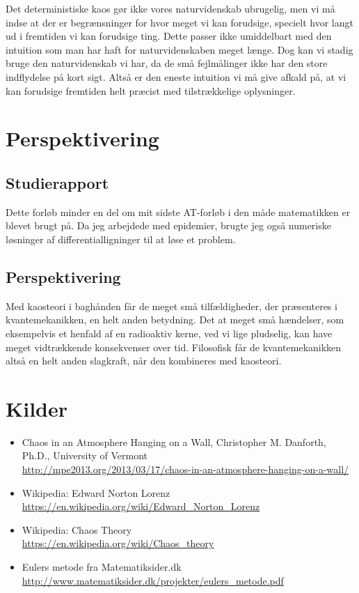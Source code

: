 \documentclass[12pt,a4paper]{article}
\theoremstyle{break}
\theoremstyle{nonumberplain}
\begin{document}
Det deterministiske kaos gør ikke vores naturvidenskab ubrugelig, men vi må indse at der er begrænsninger for hvor meget vi kan forudsige, specielt hvor langt ud i fremtiden vi kan forudsige ting. 
Dette passer ikke umiddelbart med den intuition som man har haft for naturvidenskaben meget længe. 
Dog kan vi stadig bruge den naturvidenskab vi har, da de små fejlmålinger ikke har den store indflydelse på kort sigt. 
Altså er den eneste intuition vi må give afkald på, at vi kan forudsige fremtiden helt præcist med tilstrækkelige oplysninger.

\section{Perspektivering}
\subsection{Studierapport}
Dette forløb minder en del om mit sidste AT-forløb i den måde matematikken er blevet brugt på. 
Da jeg arbejdede med epidemier, brugte jeg også numeriske løsninger af differentialligninger til at løse et problem. 

\subsection{Perspektivering}
Med kaosteori i baghånden får de meget små tilfældigheder, der præsenteres i kvantemekanikken, en helt anden betydning. 
Det at meget små hændelser, som eksempelvis et henfald af en radioaktiv kerne, ved vi lige pludselig, kan have meget vidtrækkende konsekvenser over tid. 
Filosofisk får de kvantemekanikken altså en helt anden slagkraft, når den kombineres med kaosteori.

\pagebreak
\section{Kilder}
\begin{itemize}
	\item Chaos in an Atmosphere Hanging on a Wall, Christopher M. Danforth, Ph.D., University of Vermont\\
	\url{http://mpe2013.org/2013/03/17/chaos-in-an-atmosphere-hanging-on-a-wall/}
	
	\item Wikipedia: Edward Norton Lorenz\\
	\url{https://en.wikipedia.org/wiki/Edward_Norton_Lorenz}
	
	\item Wikipedia: Chaos Theory\\
	\url{https://en.wikipedia.org/wiki/Chaos_theory}
	
	\item Eulers metode fra Matematiksider.dk\\
	\url{http://www.matematiksider.dk/projekter/eulers_metode.pdf}
	
\end{itemize}
\end{document}
